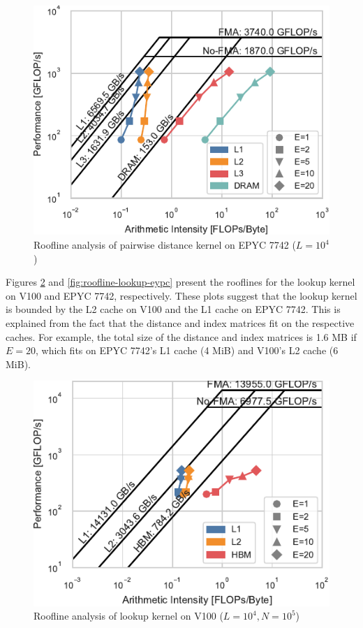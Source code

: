 \documentclass[sigconf]{acmart}
\begin{document}
\begin{figure}
    \centering
    \includegraphics[width=.90\linewidth]{figs/roofline_distances_epyc}
    \caption{Roofline analysis of pairwise distance kernel on EPYC 7742 ($L=10^4$)}%
    \label{fig:roofline-distances-epyc}
\end{figure}

Figures \ref{fig:roofline-lookup-v100} and \ref{fig:roofline-lookup-eypc} present
the rooflines for the lookup kernel on V100 and EPYC 7742, respectively. These
plots suggest that the lookup kernel is bounded by the L2 cache on V100 and
the L1 cache on EPYC 7742. This is explained from the fact that the distance
and index matrices fit on the respective caches. For example, the total size of
the distance and index matrices is 1.6 MB if $E=20$, which fits on EPYC 7742's L1
cache (4 MiB) and V100's L2 cache (6 MiB).

\begin{figure}
    \centering
    \includegraphics[width=.90\linewidth]{figs/roofline_lookup_wo_rho_v100}
    \caption{Roofline analysis of lookup kernel on V100 ($L=10^4, N=10^5$)}%
    \label{fig:roofline-lookup-v100}
\end{figure}
\end{document}
